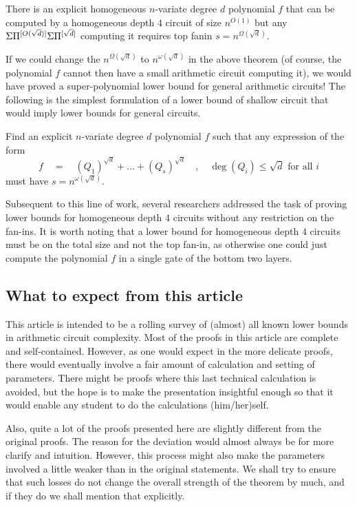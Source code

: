 \begin{theorem}
There is an explicit homogeneous $n$-variate degree $d$ polynomial $f$ that can be computed by a homogeneous depth $4$ circuit of size $n^{O(1)}$ but any $\Sigma\Pi^{[O(\sqrt{d})]}\Sigma\Pi^{[\sqrt{d}]}$ computing it requires top fanin $s = n^{\Omega(\sqrt{d})}$.
\end{theorem}

If we could change the $n^{\Omega(\sqrt{d})}$ to $n^{\omega(\sqrt{d})}$ in the above theorem (of course, the polynomial $f$ cannot then have a small arithmetic circuit computing it), we would have proved a super-polynomial lower bound for general arithmetic circuits! The following is the simplest formulation of a lower bound of shallow circuit that would imply lower bounds for general circuits. \\

\begin{openproblem}\label{openprob:main} Find an explicit $n$-variate degree $d$ polynomial $f$ such that any expression of the form
\[
f \quad=\quad (Q_1)^{\sqrt{d}} + \dots + (Q_{s})^{\sqrt{d}}\quad,\quad \deg(Q_i) \leq \sqrt{d} \text{ for all $i$}
\]
must have $s = n^{\omega(\sqrt{d})}$. 
\end{openproblem}
\bigskip 

Subsequent to this line of work, several researchers addressed the task of proving lower bounds for homogeneous depth $4$ circuits without any restriction on the fan-ins. It is worth noting that a lower bound for homogeneous depth $4$ circuits must be on the total size and not the top fan-in, as otherwise one could just compute the polynomial $f$ in a single gate of the bottom two layers. 

\subsection*{What to expect from this article}

This article is intended to be a rolling survey of (almost) all known lower bounds in arithmetic circuit complexity. Most of the proofs in this article are complete and self-contained. However, as one would expect in the more delicate proofs, there would eventually involve a fair amount of calculation and setting of parameters. There might be proofs where this last technical calculation is avoided, but the hope is to make the presentation insightful enough so that it would enable any student to do the calculations (him/her)self.

Also, quite a lot of the proofs presented here are slightly different from the original proofs. The reason for the deviation would almost always be for more clarify and intuition. However, this process might also make the parameters involved a little weaker than in the original statements. We shall try to ensure that such losses do not change the overall strength of the theorem by much, and if they do we shall mention that explicitly. 

